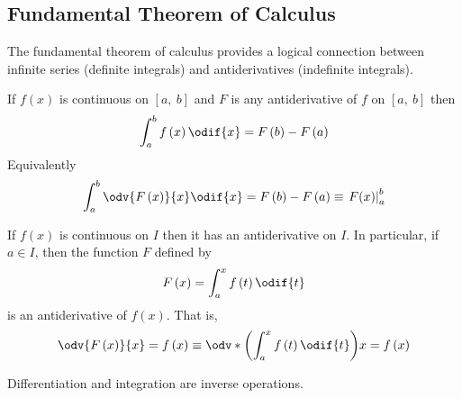\documentclass{article}
\begin{document}
\subsection{Fundamental Theorem of Calculus}
The fundamental theorem of calculus provides a logical connection
between infinite series (definite integrals) and antiderivatives
(indefinite integrals).
\begin{theorem}
    If \(f\left( x \right)\) is continuous on \(\left[ a,\:b \right]\) and \(F\) is
    any antiderivative of \(f\) on \(\left[ a,\:b \right]\) then
    \begin{equation*}
        \int_a^b f\left( x \right)\odif{x} = F\left( b \right) - F\left( a \right)
    \end{equation*}
    Equivalently
    \begin{equation*}
        \int_a^b \odv{F\left( x \right)}{x} \odif{x} = F\left( b \right) - F\left( a \right) \equiv \left.F(x)\right|_a^b
    \end{equation*}
\end{theorem}
\begin{theorem}
    If \(f\left( x \right)\) is continuous on \(I\) then it has an antiderivative on
    \(I\). In particular, if \(a\in I\), then the function \(F\) defined
    by
    \begin{equation*}
        F\left( x \right) = \int_a^x f\left( t \right)\odif{t}
    \end{equation*}
    is an antiderivative of \(f\left( x \right)\). That is,
    \begin{equation*}
        \odv{F\left( x \right)}{x} = f\left( x \right) \equiv \odv*{\left( \int_a^x f\left( t \right) \odif{t} \right)}{x} = f\left( x \right)
    \end{equation*}
\end{theorem}
\begin{theorem}
    Differentiation and integration are inverse operations.
\end{theorem}
\newpage
\end{document}
